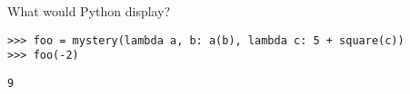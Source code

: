 \begin{blocksection}
\question What would Python display?

\begin{lstlisting}
>>> foo = mystery(lambda a, b: a(b), lambda c: 5 + square(c))
>>> foo(-2)
\end{lstlisting}

\vspace{3cm}

\begin{solution}
\begin{lstlisting}
9
\end{lstlisting}
\end{solution}
\end{blocksection}
